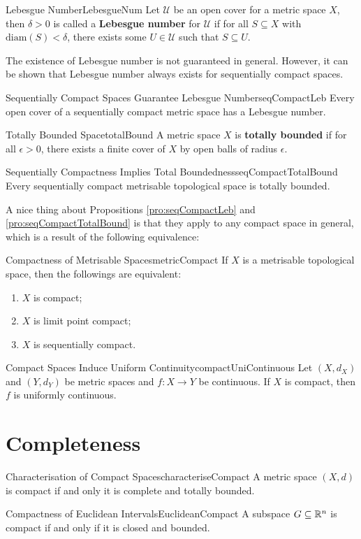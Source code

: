 \documentclass[math]{amznotes}
\theoremstyle{remark}
\begin{document}
\begin{dfnbox}{Lebesgue Number}{LebesgueNum}
    Let $\mathcal{U}$ be an open cover for a metric space $X$, then $\delta > 0$ is called a {\color{red} \textbf{Lebesgue number}} for $\mathcal{U}$ if for all $S \subseteq X$ with $\mathrm{diam}\left(S\right) < \delta$, there exists some $U \in \mathcal{U}$ such that $S \subseteq U$. 
\end{dfnbox}
The existence of Lebesgue number is not guaranteed in general. However, it can be shown that Lebesgue number always exists for sequentially compact spaces.
\begin{probox}{Sequentially Compact Spaces Guarantee Lebesgue Number}{seqCompactLeb}
    Every open cover of a sequentially compact metric space has a Lebesgue number.
\end{probox}
\begin{dfnbox}{Totally Bounded Space}{totalBound}
    A metric space $X$ is {\color{red} \textbf{totally bounded}} if for all $\epsilon > 0$, there exists a finite cover of $X$ by open balls of radius $\epsilon$.
\end{dfnbox}
\begin{probox}{Sequentially Compactness Implies Total Boundedness}{seqCompactTotalBound}
    Every sequentially compact metrisable topological space is totally bounded.
\end{probox}
A nice thing about Propositions \ref{pro:seqCompactLeb} and \ref{pro:seqCompactTotalBound} is that they apply to any compact space in general, which is a result of the following equivalence:
\begin{probox}{Compactness of Metrisable Spaces}{metricCompact}
    If $X$ is a metrisable topological space, then the followings are equivalent:
    \begin{enumerate}
        \item $X$ is compact;
        \item $X$ is limit point compact;
        \item $X$ is sequentially compact.
    \end{enumerate}
\end{probox} 
\begin{probox}{Compact Spaces Induce Uniform Continuity}{compactUniContinuous}
    Let $\left(X, d_X\right)$ and $\left(Y, d_Y\right)$ be metric spaces and $f \colon X \to Y$ be continuous. If $X$ is compact, then $f$ is uniformly continuous.
\end{probox}
\section{Completeness}
\begin{probox}{Characterisation of Compact Spaces}{characteriseCompact}
    A metric space $\left(X, d\right)$ is compact if and only it is complete and totally bounded.
\end{probox}
\begin{corbox}{Compactness of Euclidean Intervals}{EuclideanCompact}
    A subspace $G \subseteq \mathbb{R}^n$ is compact if and only if it is closed and bounded.
\end{corbox}
\end{document}
